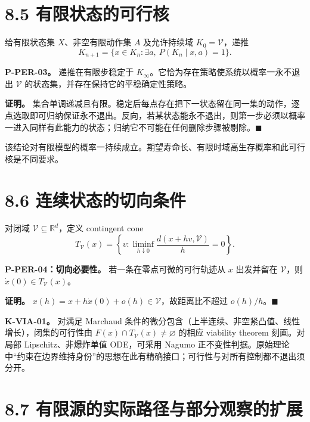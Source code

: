 \documentclass[
  11pt,
  oneside]{book}
\begin{document}
\section{8.5 有限状态的可行核}\label{ux6709ux9650ux72b6ux6001ux7684ux53efux884cux6838}

给有限状态集 \(X\)、非空有限动作集 \(A\) 及允许持续域 \(K_0=\mathcal V\)，递推 \[K_{n+1}=\{x\in K_n:\exists a,\ P(K_n\mid x,a)=1\}.\]

\hypertarget{p-per-03}{}\label{p-per-03}

\textbf{P-PER-03。} 递推在有限步稳定于 \(K_\infty\)。它恰为存在策略使系统以概率一永不退出 \(\mathcal V\) 的状态集，并存在保持它的平稳确定性策略。

\textbf{证明。} 集合单调递减且有限。稳定后每点存在把下一状态留在同一集的动作，逐点选取即可归纳保证永不退出。反向，若某状态能永不退出，则第一步必须以概率一进入同样有此能力的状态；归纳它不可能在任何删除步骤被剔除。\(\blacksquare\)

该结论对有限模型的概率一持续成立。期望寿命长、有限时域高生存概率和此可行核是不同要求。

\section{8.6 连续状态的切向条件}\label{ux8fdeux7eedux72b6ux6001ux7684ux5207ux5411ux6761ux4ef6}

对闭域 \(\mathcal V\subseteq\mathbb R^d\)，定义 contingent cone \[T_{\mathcal V}(x)=
\left\{v:\liminf_{h\downarrow0}\frac{d(x+hv,\mathcal V)}h=0\right\}.\]

\hypertarget{p-per-04}{}\label{p-per-04}

\textbf{P-PER-04：切向必要性。} 若一条在零点可微的可行轨迹从 \(x\) 出发并留在 \(\mathcal V\)，则 \(\dot x(0)\in T_{\mathcal V}(x)\)。

\textbf{证明。} \(x(h)=x+h\dot x(0)+o(h)\in\mathcal V\)，故距离比不超过 \(o(h)/h\)。\(\blacksquare\)

\textbf{K-VIA-01。} 对满足 Marchaud 条件的微分包含（上半连续、非空紧凸值、线性增长），闭集的可行性由 \(F(x)\cap T_{\mathcal V}(x)\ne\varnothing\) 的相应 viability theorem 刻画。对局部 Lipschitz、非爆炸单值 ODE，可采用 Nagumo 正不变性判据。原始理论中``约束在边界维持身份''的思想在此有精确接口；可行性与对所有控制都不退出须分开。

\section{8.7 有限源的实际路径与部分观察的扩展}\label{ux6709ux9650ux6e90ux7684ux5b9eux9645ux8defux5f84ux4e0eux90e8ux5206ux89c2ux5bdfux7684ux6269ux5c55}
\end{document}
